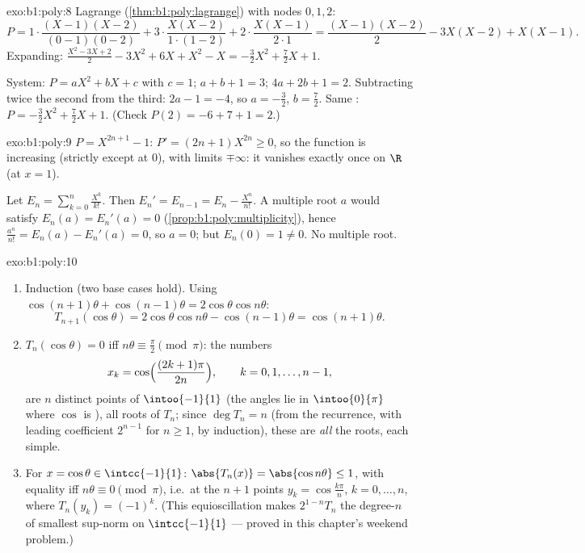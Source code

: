 \begin{solution}{exo:b1:poly:8}
Lagrange (\cref{thm:b1:poly:lagrange}) with nodes $0, 1, 2$:
\[
P = 1\cdot\frac{(X-1)(X-2)}{(0-1)(0-2)} + 3\cdot\frac{X(X-2)}{1\cdot(1-2)}
+ 2\cdot\frac{X(X-1)}{2\cdot 1}
= \frac{(X-1)(X-2)}{2} - 3X(X-2) + X(X-1).
\]
Expanding: $\frac{X^2 - 3X + 2}{2} - 3X^2 + 6X + X^2 - X =
-\frac{3}{2}X^2 + \frac{7}{2}X + 1$.

System: $P = aX^2 + bX + c$ with $c = 1$; $a + b + 1 = 3$; $4a + 2b +
1 = 2$. Subtracting twice the second from the third: $2a - 1 = -4$,
so $a = -\frac32$, $b = \frac72$. Same :
$P = -\frac32 X^2 + \frac72 X + 1$. (Check $P(2) = -6 + 7 + 1 = 2$.)
\end{solution}

\begin{solution}{exo:b1:poly:9}
$P = X^{2n+1} - 1$: $P' = (2n+1)X^{2n} \geq 0$, so the 
function is increasing (strictly except at $0$), with limits
$\mp\infty$: it vanishes exactly once on $\R$ (at $x = 1$).

Let $E_n = \sum_{k=0}^{n} \frac{X^k}{k!}$. Then $E_n' = E_{n-1} = E_n
- \frac{X^n}{n!}$. A multiple root $a$ would satisfy $E_n(a) =
E_n'(a) = 0$ (\cref{prop:b1:poly:multiplicity}), hence
$\frac{a^n}{n!} = E_n(a) - E_n'(a) = 0$, so $a = 0$; but $E_n(0) = 1
\neq 0$. No multiple root.
\end{solution}

\begin{solution}{exo:b1:poly:10}
\begin{enumerate}
  \item Induction (two base cases hold). Using $\cos(n+1)\theta +
        \cos(n-1)\theta = 2\cos\theta\cos n\theta$:
        \[
        T_{n+1}(\cos\theta) = 2\cos\theta \cos n\theta -
        \cos(n-1)\theta = \cos(n+1)\theta .
        \]
  \item $T_n(\cos\theta) = 0$ iff $n\theta \equiv \frac\pi2 \pmod
        \pi$: the numbers
        \[
        x_k = \cos\Bigl(\frac{(2k+1)\pi}{2n}\Bigr),
        \qquad k = 0, 1, \dots, n-1,
        \]
        are $n$ distinct points of $\intoo{-1}{1}$ (the angles lie in
        $\intoo{0}{\pi}$ where $\cos$ is ), all roots of
        $T_n$; since $\deg T_n = n$ (from the recurrence, with
        leading coefficient $2^{n-1}$ for $n \geq 1$, by induction),
        these are \emph{all} the roots, each simple.
  \item For $x = \cos\theta \in \intcc{-1}{1}$: $\abs{T_n(x)} =
        \abs{\cos n\theta} \leq 1$, with equality iff $n\theta \equiv
        0 \pmod\pi$, i.e.\ at the $n+1$ points $y_k =
        \cos\frac{k\pi}{n}$, $k = 0, \dots, n$, where $T_n(y_k) =
        (-1)^k$. (This equioscillation makes $2^{1-n}T_n$ the 
        degree-$n$  of smallest sup-norm on
        $\intcc{-1}{1}$ --- proved in this chapter's weekend
        problem.)
\end{enumerate}
\end{solution}

